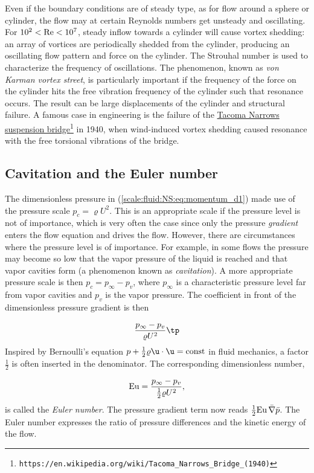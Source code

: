 \documentclass[graybox,envcountchap,sectrefs,final]{svmonodo}
\begin{document}
Even if the boundary conditions
are of steady type, as for flow around a sphere or cylinder,
the flow may at certain Reynolds numbers get unsteady and oscillating.
For $10^2 < \hbox{Re} < 10^7$, steady inflow towards a cylinder will
cause vortex shedding: an array of vortices are periodically shedded
from the cylinder, producing an oscillating flow pattern and force
on the cylinder. The Strouhal number is used to characterize the
frequency of oscillations. The phenomenon, known as \emph{von Karman
vortex street}, is particularly important if the frequency
of the force on the cylinder hits the free vibration frequency
of the cylinder such that resonance occurs. The result can be large
displacements of the cylinder and structural failure. A famous
case in engineering is the failure of the \href{{https://en.wikipedia.org/wiki/Tacoma_Narrows_Bridge_(1940)}}{Tacoma Narrows suspension
bridge}\footnote{\texttt{https://en.wikipedia.org/wiki/Tacoma\_Narrows\_Bridge\_(1940)}}
in 1940, when wind-induced vortex shedding caused resonance
with the free torsional vibrations of the bridge.


\subsection{Cavitation and the Euler number}

The dimensionless pressure in (\ref{scale:fluid:NS:eq:momentum_d1})
made use of the pressure scale $p_c=\varrho U^2$. This is an
appropriate scale if the pressure level is not of importance, which
is very often the case since only the pressure \emph{gradient} enters
the flow equation and drives the flow. However, there are circumstances
where the pressure level is of importance. For example, in some flows
the pressure may become so low that the vapor pressure of the liquid
is reached and that vapor cavities form (a phenomenon known as
\emph{cavitation}). A more appropriate pressure scale is then
$p_c = p_{\infty} - p_v$, where $p_\infty$ is a characteristic
pressure level far from vapor cavities and $p_v$ is the vapor pressure.
The coefficient in front of the dimensionless pressure gradient is then

\[ \frac{p_{\infty} - p_v}{\varrho U^2}\tp \]
Inspired by Bernoulli's equation
$p + \frac{1}{2}\varrho \u\cdot\u =
\hbox{const}$
in fluid mechanics, a factor $\frac{1}{2}$ is often inserted in the
denominator. The corresponding dimensionless number,

\begin{equation}
\hbox{Eu} = \frac{p_{\infty} - p_v}{\frac{1}{2}\varrho U^2},
\end{equation}
is called the \emph{Euler number}. The pressure gradient term now reads
$\frac{1}{2}\hbox{Eu}\,\bar\nabla\bar p$. The Euler number
expresses the ratio of pressure differences and the kinetic
energy of the flow.
\end{document}
